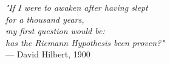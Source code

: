 \begin{flushright}
\emph{"If I were to awaken after having slept \\
for a thousand years, \\
my first question would be: \\
has the Riemann Hypothesis been proven?"}\\
— David Hilbert, 1900
\end{flushright}
